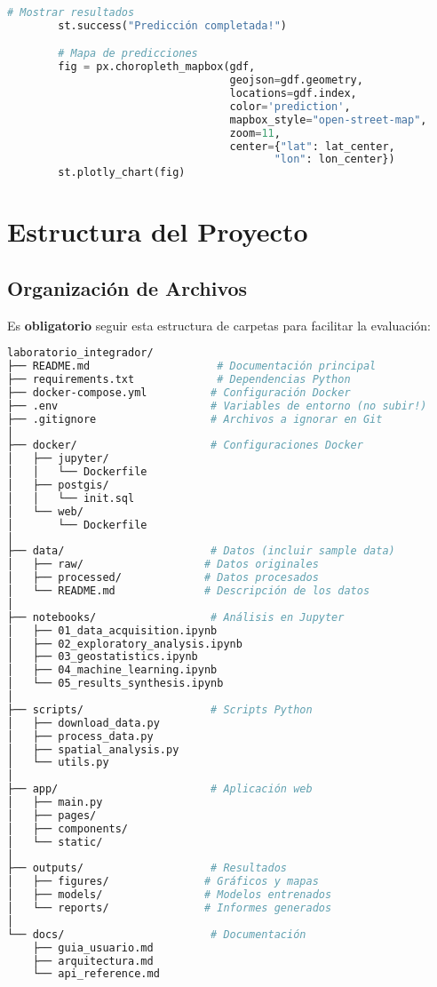 \documentclass[12pt,a4paper]{article}
\begin{document}
\begin{lstlisting}[language=Python]
        # Mostrar resultados
        st.success("Predicción completada!")

        # Mapa de predicciones
        fig = px.choropleth_mapbox(gdf,
                                   geojson=gdf.geometry,
                                   locations=gdf.index,
                                   color='prediction',
                                   mapbox_style="open-street-map",
                                   zoom=11,
                                   center={"lat": lat_center,
                                          "lon": lon_center})
        st.plotly_chart(fig)
\end{lstlisting}

\section{Estructura del Proyecto}

\subsection{Organización de Archivos}

\begin{alertbox}
Es \textbf{obligatorio} seguir esta estructura de carpetas para facilitar la evaluación:
\end{alertbox}

\begin{lstlisting}[language=bash,caption=Estructura de carpetas requerida]
laboratorio_integrador/
├── README.md                    # Documentación principal
├── requirements.txt             # Dependencias Python
├── docker-compose.yml          # Configuración Docker
├── .env                        # Variables de entorno (no subir!)
├── .gitignore                  # Archivos a ignorar en Git
│
├── docker/                     # Configuraciones Docker
│   ├── jupyter/
│   │   └── Dockerfile
│   ├── postgis/
│   │   └── init.sql
│   └── web/
│       └── Dockerfile
│
├── data/                       # Datos (incluir sample data)
│   ├── raw/                   # Datos originales
│   ├── processed/             # Datos procesados
│   └── README.md              # Descripción de los datos
│
├── notebooks/                  # Análisis en Jupyter
│   ├── 01_data_acquisition.ipynb
│   ├── 02_exploratory_analysis.ipynb
│   ├── 03_geostatistics.ipynb
│   ├── 04_machine_learning.ipynb
│   └── 05_results_synthesis.ipynb
│
├── scripts/                    # Scripts Python
│   ├── download_data.py
│   ├── process_data.py
│   ├── spatial_analysis.py
│   └── utils.py
│
├── app/                        # Aplicación web
│   ├── main.py
│   ├── pages/
│   ├── components/
│   └── static/
│
├── outputs/                    # Resultados
│   ├── figures/               # Gráficos y mapas
│   ├── models/                # Modelos entrenados
│   └── reports/               # Informes generados
│
└── docs/                       # Documentación
    ├── guia_usuario.md
    ├── arquitectura.md
    └── api_reference.md
\end{lstlisting}
\end{document}
